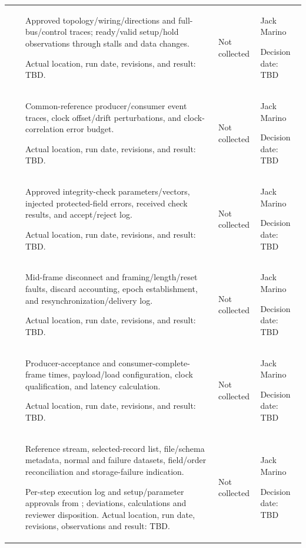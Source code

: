 \begin{landscape}
\begin{tabularx}{\linewidth}{L{2.0cm}L{3.3cm}Y L{2.3cm}L{2.6cm}}
 & \par {} & Approved topology/wiring/directions and full-bus/control traces; ready/valid setup/hold observations through stalls and data changes.\par Actual location, run date, revisions, and result: TBD. & Not collected & Jack Marino\par Decision date: TBD\\
 & \par {} & Common-reference producer/consumer event traces, clock offset/drift perturbations, and clock-correlation error budget.\par Actual location, run date, revisions, and result: TBD. & Not collected & Jack Marino\par Decision date: TBD\\
 & \par {} & Approved integrity-check parameters/vectors, injected protected-field errors, received check results, and accept/reject log.\par Actual location, run date, revisions, and result: TBD. & Not collected & Jack Marino\par Decision date: TBD\\
 & \par {} & Mid-frame disconnect and framing/length/reset faults, discard accounting, epoch establishment, and resynchronization/delivery log.\par Actual location, run date, revisions, and result: TBD. & Not collected & Jack Marino\par Decision date: TBD\\
 & \par {} & Producer-acceptance and consumer-complete-frame times, payload/load configuration, clock qualification, and latency calculation.\par Actual location, run date, revisions, and result: TBD. & Not collected & Jack Marino\par Decision date: TBD\\
 & \par {} & Reference stream, selected-record list, file/schema metadata, normal and failure datasets, field/order reconciliation and storage-failure indication.\par Per-step execution log and setup/parameter approvals from ; deviations, calculations and reviewer disposition. Actual location, run date, revisions, observations and result: TBD. & Not collected & Jack Marino\par Decision date: TBD\\

\end{tabularx}
\end{landscape}
